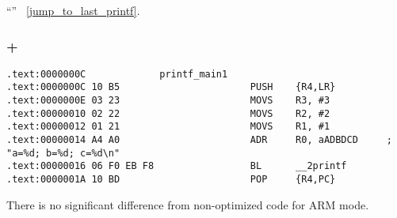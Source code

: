 ``\SwitchCaseDefaultSectionName'' 
~\ref{jump_to_last_printf}.

\subsubsection{\OptimizingKeil + \ThumbMode}

\begin{lstlisting}[caption=\OptimizingKeil + \ThumbMode]
.text:0000000C             printf_main1
.text:0000000C 10 B5                       PUSH    {R4,LR}
.text:0000000E 03 23                       MOVS    R3, #3
.text:00000010 02 22                       MOVS    R2, #2
.text:00000012 01 21                       MOVS    R1, #1
.text:00000014 A4 A0                       ADR     R0, aADBDCD     ; "a=%d; b=%d; c=%d\n"
.text:00000016 06 F0 EB F8                 BL      __2printf
.text:0000001A 10 BD                       POP     {R4,PC}
\end{lstlisting}

{There is no significant difference from non-optimized code for ARM mode}.


